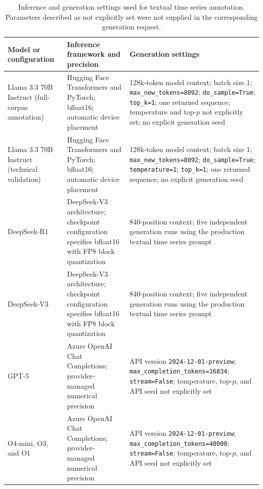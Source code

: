 \begin{table}[htbp]
\caption{
Inference and generation settings used for textual time series annotation.
Parameters described as not explicitly set were not supplied in the
corresponding generation request.
}
\ChFiveTableBodyStart
\begin{ChFiveFloatBody}

\centering


\scriptsize
\setlength{\tabcolsep}{5pt}
\renewcommand{\arraystretch}{1.18}
\begin{tabular}{
    >{\raggedright\arraybackslash}p{}
    >{\raggedright\arraybackslash}p{}
    >{\raggedright\arraybackslash}p{}
}
\toprule
\textbf{Model or configuration} &
\textbf{Inference framework and precision} &
\textbf{Generation settings} \\
\midrule

Llama 3.3 70B Instruct
(full-corpus annotation) &
Hugging Face Transformers and PyTorch;
bfloat16;
automatic device placement &
128k-token model context;
batch size 1;
\texttt{max\_new\_tokens=8092};
\texttt{do\_sample=True};
\texttt{top\_k=1};
one returned sequence;
temperature and top-$p$ not explicitly set;
no explicit generation seed \\

Llama 3.3 70B Instruct
(technical validation) &
Hugging Face Transformers and PyTorch;
bfloat16;
automatic device placement &
128k-token model context;
batch size 1;
\texttt{max\_new\_tokens=8092};
\texttt{do\_sample=True};
\texttt{temperature=1};
\texttt{top\_k=1};
one returned sequence;
no explicit generation seed \\

DeepSeek-R1 &
DeepSeek-V3 architecture;
checkpoint configuration specifies bfloat16 with FP8 block quantization &
163{,}840-position context;
five independent generation runs using the production textual time series
prompt \\

DeepSeek-V3 &
DeepSeek-V3 architecture;
checkpoint configuration specifies bfloat16 with FP8 block quantization &
163{,}840-position context;
five independent generation runs using the production textual time series
prompt \\

GPT-5 &
Azure OpenAI Chat Completions;
provider-managed numerical precision &
API version \texttt{2024-12-01-preview};
\texttt{max\_completion\_tokens=16834};
\texttt{stream=False};
temperature, top-$p$, and API seed not explicitly set \\

O4-mini, O3, and O1 &
Azure OpenAI Chat Completions;
provider-managed numerical precision &
API version \texttt{2024-12-01-preview};
\texttt{max\_completion\_tokens=40000};
\texttt{stream=False};
temperature, top-$p$, and API seed not explicitly set \\

\bottomrule
\end{tabular}

\end{ChFiveFloatBody}
\end{table}
